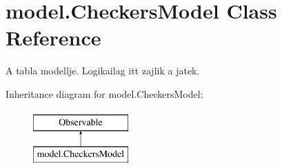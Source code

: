 \hypertarget{classmodel_1_1_checkers_model}{}\section{model.\+Checkers\+Model Class Reference}
\label{classmodel_1_1_checkers_model}


A tabla modellje. Logikailag itt zajlik a jatek.  


Inheritance diagram for model.\+Checkers\+Model\+:\begin{figure}[H]
\begin{center}
\leavevmode
\includegraphics[height=2.000000cm]{classmodel_1_1_checkers_model}
\end{center}
\end{figure}

